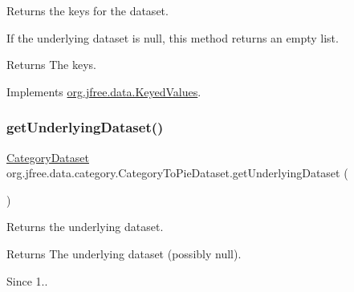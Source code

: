 Returns the keys for the dataset. 

If the underlying dataset is {\ttfamily null}, this method returns an empty list.

\begin{DoxyReturn}{Returns}
The keys. 
\end{DoxyReturn}


Implements \mbox{\hyperlink{interfaceorg_1_1jfree_1_1data_1_1_keyed_values_a5bc1316f3c71eeaa6e38effe4ea660d5}{org.\+jfree.\+data.\+Keyed\+Values}}.

\mbox{\label{classorg_1_1jfree_1_1data_1_1category_1_1_category_to_pie_dataset_abdb68ef3a107a1acaacf56e9b316e30b}} 
\subsubsection{\texorpdfstring{get\+Underlying\+Dataset()}{getUnderlyingDataset()}}
{\footnotesize\ttfamily \mbox{\hyperlink{interfaceorg_1_1jfree_1_1data_1_1category_1_1_category_dataset}{Category\+Dataset}} org.\+jfree.\+data.\+category.\+Category\+To\+Pie\+Dataset.\+get\+Underlying\+Dataset (\begin{DoxyParamCaption}{ }\end{DoxyParamCaption})}

Returns the underlying dataset.

\begin{DoxyReturn}{Returns}
The underlying dataset (possibly {\ttfamily null}).
\end{DoxyReturn}
\begin{DoxySince}{Since}
1.. 
\end{DoxySince}
\mbox{\label{classorg_1_1jfree_1_1data_1_1category_1_1_category_to_pie_dataset_a994ec52d8053b1ac0604dae5495fff5f}} 
